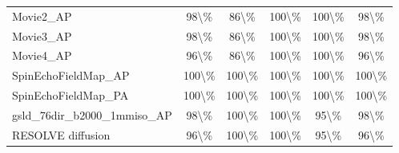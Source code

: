 \documentclass[11pt]{article}
\begin{document}
\begin{table}[htbp]
\begin{tabularx}{\textwidth}{@{}YCCCCC@{}}
Movie2\_AP & 98\textbackslash{}\% & 86\textbackslash{}\% & 100\textbackslash{}\% & 100\textbackslash{}\% & 98\textbackslash{}\% \\
 Movie3\_AP & 98\textbackslash{}\% & 86\textbackslash{}\% & 100\textbackslash{}\% & 100\textbackslash{}\% & 98\textbackslash{}\% \\
Movie4\_AP & 96\textbackslash{}\% & 86\textbackslash{}\% & 100\textbackslash{}\% & 100\textbackslash{}\% & 96\textbackslash{}\% \\
 SpinEchoFieldMap\_AP & 100\textbackslash{}\% & 100\textbackslash{}\% & 100\textbackslash{}\% & 100\textbackslash{}\% & 100\textbackslash{}\% \\
SpinEchoFieldMap\_PA & 100\textbackslash{}\% & 100\textbackslash{}\% & 100\textbackslash{}\% & 100\textbackslash{}\% & 100\textbackslash{}\% \\
 gsld\_76dir\_b2000\_1mmiso\_AP & 98\textbackslash{}\% & 100\textbackslash{}\% & 100\textbackslash{}\% & 95\textbackslash{}\% & 98\textbackslash{}\% \\
RESOLVE diffusion & 96\textbackslash{}\% & 100\textbackslash{}\% & 100\textbackslash{}\% & 95\textbackslash{}\% & 96\textbackslash{}\% \\
\bottomrule
\end{tabularx}
\end{table}

\clearpage
\end{document}
